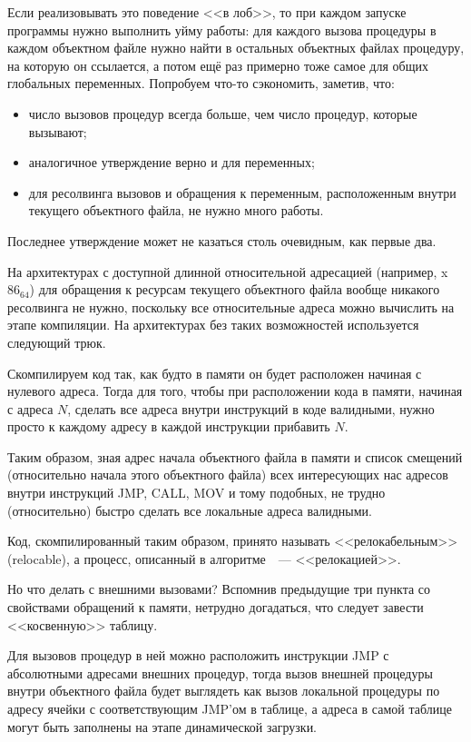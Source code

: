 Если реализовывать это поведение <<в лоб>>, то при каждом запуске программы нужно выполнить уйму работы: для каждого вызова процедуры в каждом объектном файле нужно найти в остальных объектных файлах процедуру, на которую он ссылается, а потом ещё раз примерно тоже самое для общих глобальных переменных.
Попробуем что-то сэкономить, заметив, что:
\begin{itemize}
    \item число вызовов процедур всегда больше, чем число процедур, которые вызывают;
    \item аналогичное утверждение верно и для переменных;
    \item для ресолвинга вызовов и обращения к переменным, расположенным внутри текущего объектного файла, не нужно много работы.
\end{itemize}
Последнее утверждение может не казаться столь очевидным, как первые два.

На архитектурах с доступной длинной относительной адресацией (например, x$86_{64}$) для обращения к ресурсам текущего объектного файла вообще никакого ресолвинга не нужно, поскольку все относительные адреса можно вычислить на этапе компиляции.
На архитектурах без таких возможностей используется следующий трюк.
\begin{algorithm}\label{alg:link-sumload}
    Скомпилируем код так, как будто в памяти он будет расположен начиная с нулевого адреса. Тогда для того, чтобы при расположении кода в памяти, начиная с адреса $N$, сделать все адреса внутри инструкций в коде валидными, нужно просто к каждому адресу в каждой инструкции прибавить $N$.
\end{algorithm}
Таким образом, зная адрес начала объектного файла в памяти и список смещений (относительно начала этого объектного файла) всех интересующих нас адресов внутри инструкций JMP, CALL, MOV и тому подобных, не трудно (относительно) быстро сделать все локальные адреса валидными.

Код, скомпилированный таким образом, принято называть <<релокабельным>> (relocable), а процесс, описанный в алгоритме~~--- <<релокацией>>.

Но что делать с внешними вызовами?
Вспомнив предыдущие три пункта со свойствами обращений к памяти, нетрудно догадаться, что следует завести <<косвенную>> таблицу.

Для вызовов процедур в ней можно расположить инструкции JMP с абсолютными адресами внешних процедур, тогда вызов внешней процедуры внутри объектного файла будет выглядеть как вызов локальной процедуры по адресу ячейки с соответствующим JMP'ом в таблице, а адреса в самой таблице могут быть заполнены на этапе динамической загрузки.

